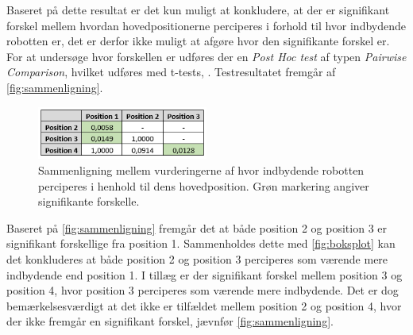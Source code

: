 Baseret på dette resultat er det kun muligt at konkludere, at der er signifikant forskel mellem hvordan hovedpositionerne perciperes i forhold til hvor indbydende robotten er, det er derfor ikke muligt at afgøre hvor den signifikante forskel er. For at undersøge hvor forskellen er udføres der en \textit{Post Hoc test} af typen \textit{Pairwise Comparison}, hvilket udføres med t-tests, \parencite[s. 1171]{PDF:PairwiseComparison}. Testresultatet fremgår af \autoref{fig:sammenligning}.
%
\begin{figure}[H]
\centering
\includegraphics[width = 0.5\textwidth]{Figure/PostHocExcel.PNG} 
\caption{Sammenligning mellem vurderingerne af hvor indbydende robotten perciperes i henhold til dens hovedposition. Grøn markering angiver signifikante forskelle.}
\label{fig:sammenligning}
\end{figure}
\noindent
%
Baseret på \autoref{fig:sammenligning} fremgår det at både position 2 og position 3 er signifikant forskellige fra position 1. Sammenholdes dette med \autoref{fig:boksplot} kan det konkluderes at både position 2 og position 3 perciperes som værende mere indbydende end position 1. I tillæg er der signifikant forskel mellem position 3 og position 4, hvor position 3 perciperes som værende mere indbydende. Det er dog bemærkelsesværdigt at det ikke er tilfældet mellem position 2 og position 4, hvor der ikke fremgår en signifikant forskel, jævnfør \autoref{fig:sammenligning}.
%

